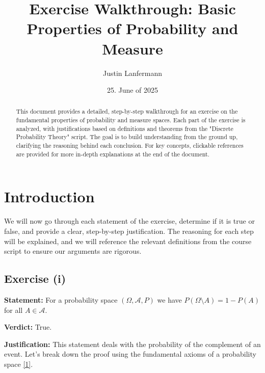 \documentclass[11pt,a4paper]{article}
\title{\textbf{Exercise Walkthrough: Basic Properties of Probability and Measure}}
\author{Justin Lanfermann}
\date{25. June of 2025}
\begin{document}
\maketitle
\begin{abstract}
    This document provides a detailed, step-by-step walkthrough for an exercise on the fundamental properties of probability and measure spaces. Each part of the exercise is analyzed, with justifications based on definitions and theorems from the "Discrete Probability Theory" script. The goal is to build understanding from the ground up, clarifying the reasoning behind each conclusion. For key concepts, clickable references are provided for more in-depth explanations at the end of the document.
\end{abstract}

\section{Introduction}
We will now go through each statement of the exercise, determine if it is true or false, and provide a clear, step-by-step justification. The reasoning for each step will be explained, and we will reference the relevant definitions from the course script to ensure our arguments are rigorous.

\subsection*{Exercise (i)}
\textbf{Statement:} For a probability space $(\Omega, \mathcal{A}, P)$ we have $P(\Omega \setminus A) = 1 - P(A)$ for all $A \in \mathcal{A}$.

\vspace{1em}

\textbf{Verdict:} True.

\textbf{Justification:}
This statement deals with the probability of the complement of an event. Let's break down the proof using the fundamental axioms of a probability space \hyperlink{note1}{[1]}.
\end{document}
